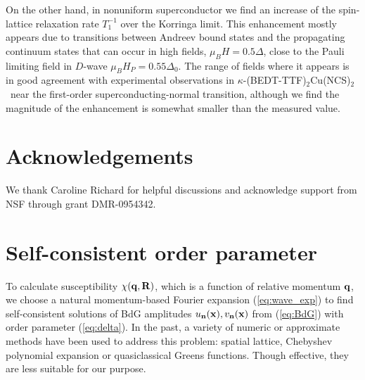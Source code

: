 \documentclass[prb,aps,showpacs,amsmath,twocolumn,10pt]{revtex4-1}
\newcommand{\kbtf}{$\kappa$-(BEDT-TTF)$_2$Cu(NCS)$_2$}
\begin{document}
On the other hand, in nonuniform superconductor we find an increase of the spin-lattice relaxation rate $T_1^{-1}$ 
over the Korringa limit. This enhancement mostly appears due to transitions 
between Andreev bound states and the propagating continuum states that can occur in high fields, 
$\mu_B H = 0.5 \Delta$, close to the Pauli limiting field in $D$-wave $\mu_B H_P = 0.55 \Delta_0$. 
The range of fields where it appears 
is in good agreement with experimental observations in \kbtf\ near the first-order 
superconducting-normal transition,\cite{Mayaffre2014} 
although we find the magnitude of the enhancement is somewhat smaller than the measured value. 

\section{Acknowledgements}

We thank Caroline Richard for helpful discussions and 
acknowledge support from NSF through grant DMR-0954342. 



\appendix*

\section{Self-consistent order parameter}
\label{app:self-cons}

To calculate susceptibility $\chi({\bf q},{\bf R})$, which is a function
of relative momentum ${\bf q}$, we choose a natural momentum-based Fourier
expansion (\ref{eq:wave_exp}) to find 
self-consistent solutions of BdG amplitudes $u_{\bf n}({\bf x}),v_{\bf n}({\bf x})$ from (\ref{eq:BdG}) with order parameter
(\ref{eq:delta}). 
In the past, a variety of numeric or approximate
methods have been used to address this problem: spatial lattice\cite{PhysRevB.57.8709,PhysRevLett.80.4763, Marcin2009},
Chebyshev polynomial expansion\cite{PhysRevLett.105.167006} or
quasiclassical Greens functions.\cite{Burkhardt1994, Vorontsov2005fflo} 
Though effective, they are less suitable for our purpose.
\end{document}

